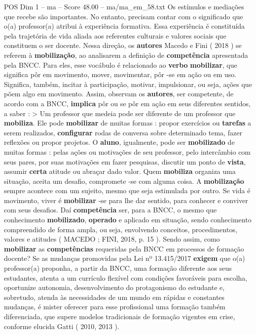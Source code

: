 \begin{textsample}{POS Dim 1 – ma – Score 48.00 – ma/ma\_em\_58.txt}
Os estímulos e mediações que recebe são importantes.
No entanto, precisam contar com o significado que o(a) professor(a) atribui à experiência formativa.
Essa experiência é constituída pela trajetória de vida aliada aos referentes culturais e valores sociais que constituem o ser docente.
Nessa direção, os \textbf{autores} Macedo e Fini ( 2018 ) se referem à \textbf{mobilização}, ao analisarem a definição de \textbf{competência} apresentada pela BNCC.
Para eles, esse vocábulo é relacionado ao \textbf{verbo} \textbf{mobilizar}, que significa pôr em movimento, mover, movimentar, pôr -se em ação ou em uso.
Significa, também, incitar à participação, motivar, impulsionar, ou seja, ações que põem algo em movimento.
Assim, observam os \textbf{autores}, ser competente, de acordo com a BNCC, \textbf{implica} pôr ou se pôr em ação em seus diferentes sentidos, a saber : > Um professor que medeia pode ser diferente de um professor que \textbf{mobiliza}.
Ele pode \textbf{mobilizar} de muitas formas : propor exercícios ou \textbf{tarefas} a serem realizados, \textbf{configurar} rodas de conversa sobre determinado tema, fazer reflexões ou propor projetos.
O \textbf{aluno}, igualmente, pode ser \textbf{mobilizado} de muitas formas : pelas ações ou motivações de seu professor, pelo intercâmbio com seus pares, por suas motivações em fazer pesquisas, discutir um ponto de \textbf{vista}, assumir \textbf{certa} atitude ou abraçar dado valor.
Quem \textbf{mobiliza} organiza uma situação, aceita um desafio, compromete -se com alguma coisa.
A \textbf{mobilização} sempre acontece com um sujeito, mesmo que seja estimulada por outro.
Se vida é movimento, viver é \textbf{mobilizar} -se para lhe dar sentido, para conhecer e conviver com seus desafios.
Daí \textbf{competência} ser, para a BNCC, o mesmo que conhecimento \textbf{mobilizado}, \textbf{operado} e aplicado em situação, sendo conhecimento compreendido de forma ampla, ou seja, envolvendo conceitos, procedimentos, valores e atitudes ( MACEDO ; FINI, 2018, p. 15 ).
Sendo assim, como \textbf{mobilizar} as \textbf{competências} requeridas pela BNCC em processos de formação docente?
Se as mudanças promovidas pela Lei nº 13.415/2017 \textbf{exigem} que o(a) professor(a) proponha, a partir da BNCC, uma formação diferente aos seus estudantes, atenta a um currículo flexível com condições favoráveis para escolha, oportunize autonomia, desenvolvimento do protagonismo do estudante e, sobretudo, atenda às necessidades de um mundo em rápidas e constantes mudanças, é mister oferecer para esse profissional uma formação também diferenciada, que supere modelos tradicionais de formação vigentes em crise, conforme elucida Gatti ( 2010, 2013 ).

\end{textsample}
